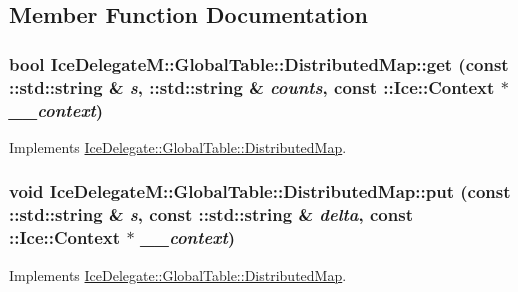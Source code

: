 \subsection{Member Function Documentation}
\hypertarget{class_ice_delegate_m_1_1_global_table_1_1_distributed_map_a1b87848a88f6d10e865f13398512daf7}{
\subsubsection[{get}]{\setlength{\rightskip}{0pt plus 5cm}bool IceDelegateM::GlobalTable::DistributedMap::get (const ::std::string \& {\em s}, \/  ::std::string \& {\em counts}, \/  const ::Ice::Context $\ast$ {\em \_\-\_\-context})}}
\label{class_ice_delegate_m_1_1_global_table_1_1_distributed_map_a1b87848a88f6d10e865f13398512daf7}


Implements \hyperlink{class_ice_delegate_1_1_global_table_1_1_distributed_map_a024ac1e825e6c918e191bcf737b0a190}{IceDelegate::GlobalTable::DistributedMap}.

\hypertarget{class_ice_delegate_m_1_1_global_table_1_1_distributed_map_ab20480bb054ed00e52cbfd2e7d0d5439}{
\subsubsection[{put}]{\setlength{\rightskip}{0pt plus 5cm}void IceDelegateM::GlobalTable::DistributedMap::put (const ::std::string \& {\em s}, \/  const ::std::string \& {\em delta}, \/  const ::Ice::Context $\ast$ {\em \_\-\_\-context})}}
\label{class_ice_delegate_m_1_1_global_table_1_1_distributed_map_ab20480bb054ed00e52cbfd2e7d0d5439}


Implements \hyperlink{class_ice_delegate_1_1_global_table_1_1_distributed_map_a145c6fd07b6d19f68f28414f0ae972f5}{IceDelegate::GlobalTable::DistributedMap}.


